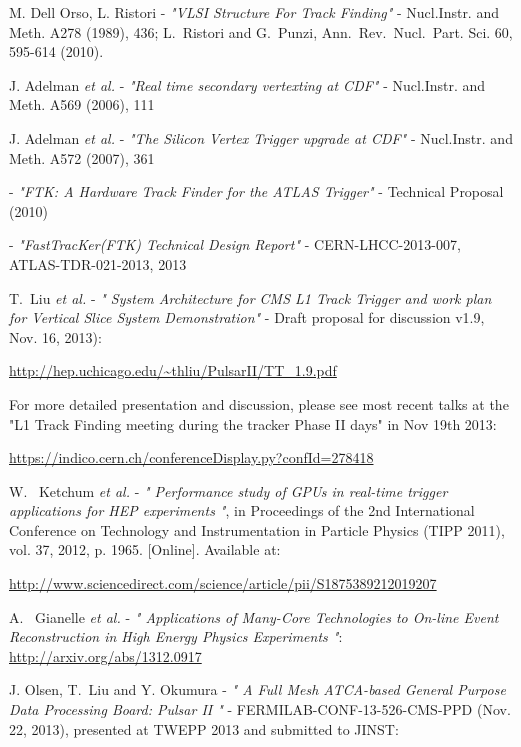 \documentclass[10pt,a4paper]{article}
\begin{document}
\begin{thebibliography}{99}


 M. Dell Orso, L. Ristori - {\it "VLSI Structure For Track Finding"} - Nucl.Instr. and Meth. A278 (1989), 436; L.~Ristori and G.~Punzi, Ann.~Rev.~Nucl.~Part. Sci. 60, 595-614 (2010).

 J. Adelman {\it et al.} - {\it "Real time secondary vertexting at CDF"} - Nucl.Instr. and Meth. A569 (2006), 111

 J. Adelman {\it et al.} - {\it "The Silicon Vertex Trigger upgrade at CDF"} - Nucl.Instr. and Meth. A572 (2007), 361

  - {\it "FTK: A Hardware Track Finder for the ATLAS Trigger"} - Technical Proposal (2010)

  - {\it "FastTracKer(FTK) Technical Design Report"} - CERN-LHCC-2013-007, ATLAS-TDR-021-2013, 2013


 T.~Liu {\it et al.} - {\it "
System Architecture for CMS L1 Track Trigger and work plan for Vertical Slice System
Demonstration"} - Draft proposal for discussion v1.9, Nov. 16, 2013):

\url{http://hep.uchicago.edu/~thliu/PulsarII/TT_1.9.pdf}

For more detailed presentation and discussion, please see most recent talks at the "L1 Track Finding meeting during the tracker Phase II days" in Nov 19th 2013:

\url{https://indico.cern.ch/conferenceDisplay.py?confId=278418}

 W. ~Ketchum {\it et al.}  - {\it "
Performance study of GPUs in real-time trigger applications for HEP experiments
"}, in Proceedings of the 2nd International Conference on Technology and Instrumentation in Particle Physics (TIPP 2011), vol. 37, 2012, p. 1965. [Online]. 
Available at: 

\url{http://www.sciencedirect.com/science/article/pii/S1875389212019207}


 A. ~Gianelle {\it et al.}  - {\it "
Applications of Many-Core Technologies to On-line Event Reconstruction in High Energy Physics Experiments
"}:
\url{http://arxiv.org/abs/1312.0917}



 J. Olsen, T.~Liu and Y. Okumura - {\it "
A Full Mesh ATCA-based General Purpose Data Processing Board: Pulsar II
"} - FERMILAB-CONF-13-526-CMS-PPD (Nov. 22, 2013), presented at TWEPP 2013 and submitted to JINST:


\end{thebibliography}
\end{document}
